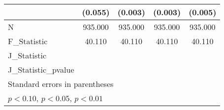 {\begin{tabular}{l*{4}{c}}
            &     (0.055)         &     (0.003)         &     (0.003)         &     (0.005)         \\
\hline
N           &     935.000         &     935.000         &     935.000         &     935.000         \\
F\_Statistic &      40.110         &      40.110         &      40.110         &      40.110         \\
J\_Statistic &                     &                     &                     &                     \\
J\_Statistic\_pvalue&                     &                     &                     &                     \\
\hline\hline
\multicolumn{5}{l}{\footnotesize Standard errors in parentheses}\\
\multicolumn{5}{l}{\footnotesize \sym{*} \(p<0.10\), \sym{**} \(p<0.05\), \sym{***} \(p<0.01\)}\\
\end{tabular}
}
